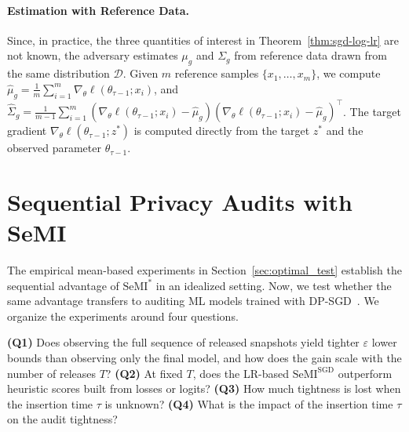 \documentclass{article}
\theoremstyle{plain}
\theoremstyle{definition}
\theoremstyle{remark}
\newcommand{\cD}{\ensuremath{\mathcal{D}}}
\newcommand{\SeMIstar}{\mathrm{SeMI}^{\ast}}
\newcommand{\SeMISGD}{\mathrm{SeMI}^{\mathrm{SGD}}}
\begin{document}


    {\color{red}
    \paragraph{Estimation with Reference Data.} Since, in practice, the three quantities of interest in Theorem~\ref{thm:sgd-log-lr} are not known, the adversary estimates $\mu_g$ and $\Sigma_g$ from reference data drawn from the same distribution $\cD$. Given $m$ reference samples $\{x_1, \ldots, x_m\}$, we compute
    $\hat{\mu}_g = \frac{1}{m}\sum_{i=1}^m \nabla_\theta \ell(\theta_{\tau-1}; x_i)$, and $\hat{\Sigma}_g = \frac{1}{m-1}\sum_{i=1}^m (\nabla_\theta \ell(\theta_{\tau-1}; x_i) - \hat{\mu}_g)(\nabla_\theta \ell(\theta_{\tau-1}; x_i) - \hat{\mu}_g)^\top$.
    The target gradient $\nabla_\theta \ell(\theta_{\tau-1}; z^*)$ is computed directly from the target $z^*$ and the observed parameter $\theta_{\tau-1}$.}
\fi


\vspace*{-0.6em}\section{Sequential Privacy Audits with SeMI}
\label{sec:experiments}\vspace*{-0.5em}

The empirical mean-based experiments in Section~\ref{sec:optimal_test} establish the sequential advantage of $\SeMIstar$ in an idealized setting. Now, we test whether the same advantage transfers to auditing ML models trained with DP-SGD~\citep{abadi2016deep}. We organize the experiments around four questions.
\vspace*{-0.2em}
\begin{tcolorbox}[top=2pt,bottom=2pt,left=1pt,right=1pt]
    \textbf{(Q1)} Does observing the full sequence of released snapshots yield tighter $\varepsilon$ lower bounds than observing only the final model, and how does the gain scale with the number of releases $T$? \textbf{(Q2)} At fixed $T$, does the LR-based $\SeMISGD$ outperform heuristic scores built from losses or logits? \textbf{(Q3)} How much tightness is lost when the insertion time $\tau$ is unknown? \textbf{(Q4)} What is the impact of the insertion time $\tau$ on the audit tightness?
\end{tcolorbox}\vspace*{-0.2em}
\end{document}
